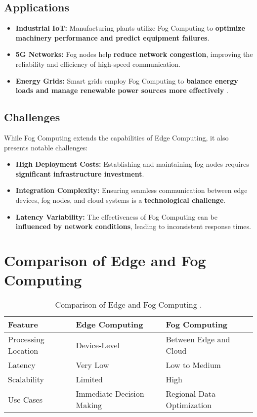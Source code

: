 \documentclass[conference]{IEEEtran}
\begin{document}
	\subsection{Applications}
	\begin{itemize}
		\item \textbf{Industrial IoT:} Manufacturing plants utilize Fog Computing to \textbf{optimize machinery performance and predict equipment failures}.
		\item \textbf{5G Networks:} Fog nodes help \textbf{reduce network congestion}, improving the reliability and efficiency of high-speed communication.
		\item \textbf{Energy Grids:} Smart grids employ Fog Computing to \textbf{balance energy loads and manage renewable power sources more effectively} \cite{cisco2015fog}.
	\end{itemize}
	
	\subsection{Challenges}
	While Fog Computing extends the capabilities of Edge Computing, it also presents notable challenges:
	\begin{itemize}
		\item \textbf{High Deployment Costs:} Establishing and maintaining fog nodes requires \textbf{significant infrastructure investment}.
		\item \textbf{Integration Complexity:} Ensuring seamless communication between edge devices, fog nodes, and cloud systems is a \textbf{technological challenge}.
		\item \textbf{Latency Variability:} The effectiveness of Fog Computing can be \textbf{influenced by network conditions}, leading to inconsistent response times.
	\end{itemize}
	
	\section{Comparison of Edge and Fog Computing}
	\begin{table}[!t]
		\centering
		\begin{tabular}{|l|l|l|}
			\hline
			\textbf{Feature} & \textbf{Edge Computing} & \textbf{Fog Computing} \\
			\hline
			Processing Location & Device-Level & Between Edge and Cloud \\
			Latency & Very Low & Low to Medium \\
			Scalability & Limited & High \\
			Use Cases & Immediate Decision-Making & Regional Data Optimization \\
			\hline
		\end{tabular}
		\caption{Comparison of Edge and Fog Computing \cite{shi2016edge}.}
		\label{table:comparison}
	\end{table}
	
\end{document}
